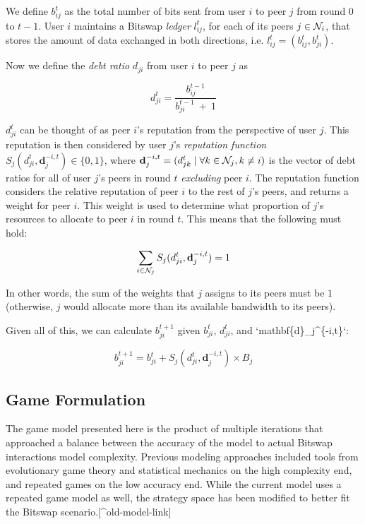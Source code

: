 We define $b_{ij}^t$ as the total number of bits sent from user $i$
to peer $j$ from round $0$ to $t-1$. User $i$ maintains a
Bitswap \emph{ledger} $l_{ij}^t$, for each of its peers
$j \in \mathcal{N}_{i}$, that stores the amount of data exchanged in both
directions, i.e. $l_{ij}^t = (b_{ij}^t, b_{ji}^t)$.

Now we define the \emph{debt ratio} $d_{ji}$ from user $i$ to peer
$j$ as

\[d_{ji}^t = \frac{b_{ij}^{t-1}}{b_{ji}^{t-1}\:+\:1}\]

$d_{ji}^t$ can be thought of as peer $i$'s reputation from the
perspective of user $j$. This reputation is then considered by user
$j$'s \emph{reputation function}
$S_j(d_{ji}^t, \mathbf{d}_j^{-i,t}) \in \{0, 1\}$, where
$\mathbf{d}_j^{-i,t} = (d_{jk}^t \mid \forall k \in \mathcal{N}_{j}, k \neq i)$
is the vector of debt ratios for all of user $j$'s peers in round
$t$ \emph{excluding} peer $i$. The reputation function considers the
relative reputation of peer $i$ to the rest of $j$'s peers, and
returns a weight for peer $i$. This weight is used to determine what
proportion of $j$'s resources to allocate to peer $i$ in round
$t$. This means that the following must hold:

\[\sum_{i \in \mathcal{N}_{j}} S_j(d_{ji}^t, \mathbf{d}_j^{-i,t}) = 1\]

In other words, the sum of the weights that $j$ assigns to its peers
must be $1$ (otherwise, $j$ would allocate more than its available
bandwidth to its peers).

Given all of this, we can calculate $b_{ji}^{t+1}$ given $b_{ji}^t$,
$d_{ji}^t$, and `mathbf\{d\}\_j\^{}\{-i,t\}`:

\[b_{ji}^{t+1} = b_{ji}^{t} + S_j(d_{ji}^t, \mathbf{d}_j^{-i,t}) \times B_j\]

\hypertarget{game-formulation}{%
\subsection{Game Formulation}\label{game-formulation}}

The game model presented here is the product of multiple iterations that
approached a balance between the accuracy of the model to actual Bitswap
interactions model complexity. Previous modeling approaches included
tools from evolutionary game theory and statistical mechanics on the
high complexity end, and repeated games on the low accuracy end. While
the current model uses a repeated game model as well, the strategy space
has been modified to better fit the Bitswap
scenario.{[}\^{}old-model-link{]}

